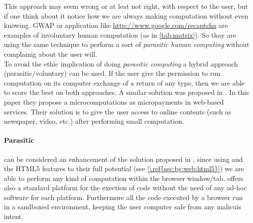 This approach may seem wrong or at leat not right, with respect to the user, but
if one think about it notice how we are always making computation without even
knowing. \ac{GWAP} or application like \href{reCAPTCHA}{http://www.google.com/recaptcha}
are examples of involuntary human computation (as in \autoref{tab:matrix}). So
thay are using the same technique to perform a sort of \emph{parasitic human
computing} without complainig about the user will.\\

To avoid the ethic implication of doing \emph{parasitic computing} a hybrid
approach (parasitic/voluntary) can be used. If the user give the permission to
run computation on its computer exchange of a return of any type, then we are
able to score the best on both approaches. A similar solution was proposed in
\cite{karame2011pay}.
In this paper they propose a microcomputations as micropayments in web-based
services. Their solution is to give the user access to online contents (such as
newspaper, video, etc.) after performing small \js{} computation.

\paragraph{Parasitic \js{}} can be considered an enhancement of the solution
proposed in \cite{barabasi2001parasitic}, since using \js{} and the HTML5
features to their full potential (see \ref{\ref{sec:bg:web:html5}}) we are able
to perform any kind of computation within the browser window/tab. \js{} offers
also a standard platform for the exection of code without the need of any ad-hoc
software for each platform. Furthermore all the code executed by a browser run
in a sandboxed environment, keeping the user computer safe from any malicuis
intent.